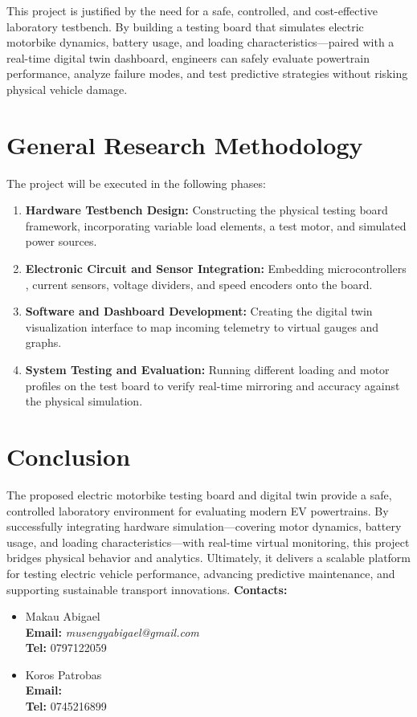 \documentclass[12pt, a4paper]{article}
\begin{document}
This project is justified by the need for a safe, controlled, and cost-effective laboratory testbench. By building a testing board that simulates electric motorbike dynamics, battery usage, and loading characteristics—paired with a real-time digital twin dashboard, engineers can safely evaluate powertrain performance, analyze failure modes, and test predictive strategies without risking physical vehicle damage.

\section{General Research Methodology}
The project will be executed in the following phases:
\begin{enumerate}[label=\alph*)]
    \item \textbf{Hardware Testbench Design:} Constructing the physical testing board framework, incorporating variable load elements, a test motor, and simulated power sources.
    \item \textbf{Electronic Circuit and Sensor Integration:} Embedding microcontrollers , current sensors, voltage dividers, and speed encoders onto the board.
    \item \textbf{Software and Dashboard Development:} Creating the digital twin visualization interface to map incoming telemetry to virtual gauges and graphs.
    \item \textbf{System Testing and Evaluation:} Running different loading and motor profiles on the test board to verify real-time mirroring and accuracy against the physical simulation.
\end{enumerate}


\section{Conclusion}

The proposed electric motorbike testing board and digital twin provide a safe, controlled laboratory environment for evaluating modern EV powertrains. By successfully integrating hardware simulation—covering motor dynamics, battery usage, and loading characteristics—with real-time virtual monitoring, this project bridges physical behavior and analytics. Ultimately, it delivers a scalable platform for testing electric vehicle performance, advancing predictive maintenance, and supporting sustainable transport innovations.
\vspace{1em}
\noindent\textbf{Contacts:}
\begin{itemize}
    \item Makau Abigael  
    \\\textbf{Email:} \textit{musengyabigael@gmail.com}
   \\ \textbf{Tel:} 0797122059
    \item Koros Patrobas  
    \\\textbf{Email:} \textit{}
   \\ \textbf{Tel:} 0745216899
\end{itemize}
\end{document}
